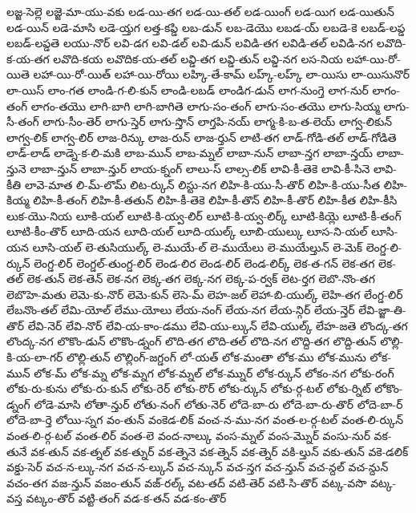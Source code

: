 {లజ్జ-సెల్లె
లజ్జె-మా-యు-వకు
లడ-యి-తగ
లడ-యి-తల్
లడ-యింగ్
లడ-యిగ
లడ-యితున్
లడ-యిన్
లడె-మాసి
లడె-య్తగ
లత్త-కప్డి
లబ-డున్
లబ-డెయొ
లబడ-య్
లబడె-కె
లబడ్-లప్డ
లబడ్-లప్డతె
లయు-నొర్
లవి-డగ
లవి-డల్
లవి-డున్
లవిడి-తగ
లవిడి-తల్
లవిడి-నగ
లవొది-క-య-తగ
లవొది-కయ
లవొదిక-య-తల్
లవ్డి-తగ
లవ్డి-తున్
లవ్డి-నగ
లస-నియ
లహా-యి-రో-యితె
లహా-యి-రో-యిత్
లహా-యి-రోయి
లహ్కి-తే-కామ్
లహ్క్-లహ్క్
లా-యిసు
లా-యిసునొర్
లా-యిస్
లాం-గత
లాండి-గ-లి-కున్
లాండి-లబడ్
లాండిగ-డున్
లాగ-నుంగ్తె
లాగ-నుర్
లాగం-తంగ్
లాగం-తయొ
లాగి-బాగి
లాగి-బాగితె
లాగు-సం-తంగ్
లాగు-సం-తయొ
లాగు-సియ్మ
లాగు-సీ-తంగ్
లాగు-సీం-తెర్
లాగు-స్తెర్
లాగు-స్తొన్
లాగ్తపి-నయ్
లాగ్మ-కి-బ-త-లెయ్
లాగ్వ-లికున్
లాగ్వ-లిక్
లాగ్వ-లిర్
లాజ-రిన్కు
లాజ-రున్
లాజ-ర్తున్
లాటి-తగ
లాడ్-గోడి-తల్
లాడ్-గోడితె
లాడ్-లాడ్
లాడ్నె-క-లి-మకి
లాబ-మున్
లాబ-మ్నల్
లాబా-నున్
లాబా-న్తగ
లాబా-న్తయ్
లాబా-న్తునె
లాబా-న్తున్
లాబా-న్తుర్
లాయ-క్నంగ్
లాలు-స్
లాల్స-లిక్
లావి-కీ-తెకె
లావి-కీ-సినె
లావి-కీతి
లావె-మాత
లి-మ్-లొమ్
లిట-ర్కున్
లిస్టు-నగ
లిహి-కి-యు-సీ-తొర్
లిహి-కి-యు-సీత
లిహి-కియ్మ
లిహి-కీ-తంగ్
లిహి-కీ-తతున్
లిహి-కీ-తెకె
లిహి-కీ-తొన్
లిహి-కీ-తొర్
లిహి-కీత
లిహి-కీసి
లుక-యొ-నియ
లూకి-యల్
లూటి-కి-య్వ-లిర్
లూటి-కి-య్వ-లిర్క్
లూటి-కియ్లె
లూటి-కీ-తంగ్
లూటి-కీం-తొర్
లూది-యన
లూది-యల్
లూది-యుల్క్
లూబి-యుల్కు
లూస-ని-యల్
లూసి-యన
లూసి-యల్
లె-తుసియుల్క్
లె-ముయే-ల్
లె-ముయేలు
లె-ముయేల్తున్
లె-మెక్
లెంగ్డ-లి-ర్కున్
లెంగ్డ-లిర్
లెంగ్డల్-తుంగ్డ-లిర్
లెండ-లిర
లెండ-లిర్
లెండ-లిర్క్
లెక-త-గన్
లెక-తగ
లెక-తల్
లెక-తున్
లెక-తెన్
లెక-నగ
లెక్క-తగ
లెక్క-నగ
లెక్క-ప-ర్వక్
లెట-ర్తగ
లెబొ-నొం-తగ
లెబొహె-మతు
లెమె-కు-నొర్
లెమె-కున్
లెసె-మ్
లెహ-జల్
లెహా-బి-యుల్క్
లెహి-తగ
లేంగ్డ-లిర్
లేబనొం-తల్
లేమి-యోల్
లేము-యోలు
లేయ-నంగ్
లేయ-నగ
లేయ-న్గిర్
లేయ-న్తెర్
లేవి-జ్జా-తి-తొర్
లేవి-నెర్
లేవి-నొర్
లేవి-య-కాం-డము
లేవి-యు-ల్కున్
లేవి-యుల్క్
లేహ-జతె
లొంద్క-తగ
లొంద్క-నగ
లొకొం-డున్
లొకొం-డ్నంగ్
లొది-తగ
లొది-తల్
లొది-నగ
లొద్ది-తగ
లొద్ది-తున్
లొల్లి-కి-య-లా-గర్
లొల్లి-తున్
లొల్లింగ్-జగ్డంగ్
లో-యత్
లోక-మంతా
లోక-ము
లోక-మును
లోక-మున్
లోక-మ్
లోక-మ్న
లోక-మ్నగ
లోక-మ్నల్
లోక-మ్నుర్
లోక-ర్కున్
లోకం-నగ
లోకు-రంగ్
లోకు-రు-కును
లోకు-రు-కున్
లోకు-రెర్
లోకు-రొర్
లోకు-ర్కున్
లోకు-ర్గ-టల్
లోకు-ర్నిట్
లోకొం-డ్నంగ్
లోడె-మాసి
లోతా-న్తుర్
లోతు-నంగ్
లోతు-నెర్
లోదె-బా-రు
లోదె-బా-రు-తొర్
లోదె-బా-ర్
లోదె-బా-ర్తె
లోయి-స్నగ
వం-తున్
వంకెడ-లిక్
వంచ-న-ము-నగ
వంత-ల-ర్గ-టల్
వంత-లి-ర్కున్
వంత-లి-ర్గ-టల్
వంత-లిర్
వంత-లె
వంద-నాల్కు
వంస-మ్నల్
వంస-మ్నొర్
వంసు-నుర్
వక-తునే
వక-తున్
వక-త్నల్
వక-త్నుర్
వక-త్నెనె
వక-త్నెన్
వక-త్నెర్
వకి-ల్తున్
వకు-తున్
వకె-డలిక్
వక్డు-సెర్
వచ-న-ల్కు-నగ
వచ-న-ల్కున్
వచ-న్కున్
వచ-న్తగ
వచ-న్తున్
వచ-న్దల్
వచ-న్దున్
వచం-తగ
వజ-న్తున్
వజం-తున్
వజ్-రల్క్
వట-తద్
వటి-తెర్
వటి-సి-తొర్
వట్క-వసొ
వట్క-వస్త
వట్కం-తొర్
వట్టి-తంగ్
వడ-క-తన్
వడ-కం-తొర్
}
